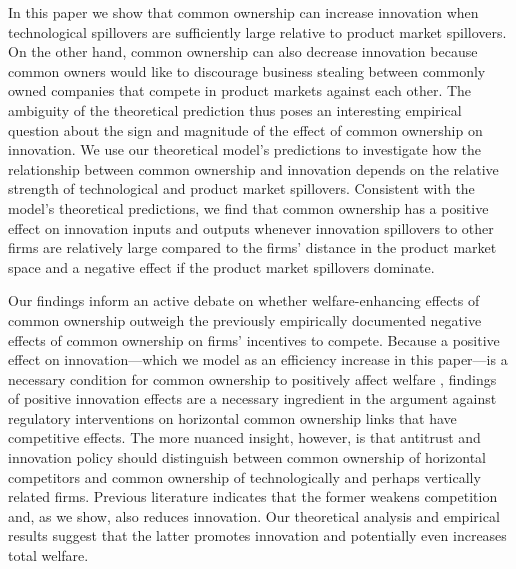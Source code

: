 \documentclass[12pt]{article}
\begin{document}
In this paper we show that common ownership can increase innovation when technological spillovers are sufficiently large relative to product market spillovers. On the other hand, common ownership can also decrease innovation because common owners would like to discourage business stealing between commonly owned companies that compete in product markets against each other. The ambiguity of the theoretical prediction thus poses an interesting empirical question about the sign and magnitude of the effect of common ownership on innovation. We use our theoretical model's predictions to investigate how the relationship between common ownership and innovation depends on the relative strength of technological and product market spillovers. Consistent with the model's theoretical predictions, we find that common ownership has a positive effect on innovation inputs and outputs whenever innovation spillovers to other firms are relatively large compared to the firms' distance in the product market space and a negative effect if the product market spillovers dominate.


Our findings inform an active debate on whether welfare-enhancing effects of common ownership outweigh the previously empirically documented negative effects of common ownership on firms' incentives to compete. Because a positive effect on innovation---which we model as an efficiency increase in this paper---is a necessary condition for common ownership to positively affect welfare \citep{lopez2016cross}, findings of positive innovation effects are a necessary ingredient in the argument against regulatory interventions on horizontal common ownership links that have competitive effects. The more nuanced insight, however, is that antitrust and innovation policy should distinguish between common ownership of horizontal competitors and common ownership of technologically and perhaps vertically related firms. Previous literature indicates that the former weakens competition and, as we show, also reduces innovation. Our theoretical analysis and empirical results suggest that the latter promotes innovation and potentially even increases total welfare.
\end{document}
